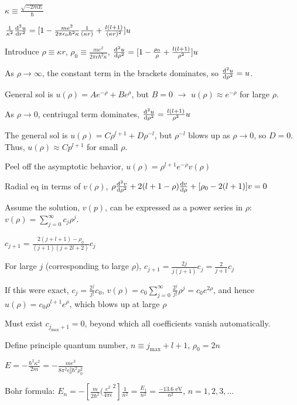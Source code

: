$\kappa \equiv \frac{\sqrt{-2mE}}{\hbar}$

$\frac{1}{\kappa^2} \dv[2]{u}{r} = [1 - \frac{me^2}{2 \pi \epsilon_0 \hbar^2 \kappa} \frac{1}{(\kappa r)} + \frac{l (l+1)}{(\kappa r)^2}] u$

Introduce $\rho \equiv \kappa r$, $\rho_0 \equiv \frac{me^2}{2 \pi \epsilon \hbar^2 \kappa}$, $\dv[2]{u}{\rho} = [1 - \frac{\rho_0}{\rho} + \frac{l(l+1)}{\rho^2}]u$

As $\rho \rightarrow \infty$, the constant term in the brackets dominates, so $\dv[2]{u}{\rho} = u$.

General sol is $u(\rho) = Ae^{-\rho} + Be^{\rho}$, but $B=0$ $\rightarrow$ $u(\rho) \approx e^{-\rho}$ for large $\rho$.

As $\rho \rightarrow 0$, centriugal term dominates, $\dv[2]{u}{\rho} = \frac{l(l+1)}{\rho^2} u$

The general sol is $u(\rho) = C \rho^{l+1} + D \rho^{-l}$, but $\rho^{-l}$ blows up as $\rho \rightarrow 0$, so $D = 0$. Thus, $u(\rho) \approx C p^{l+1}$ for small $\rho$. 

Peel off the asymptotic behavior, $u(\rho) = \rho^{l+1} e^{-\rho} v(\rho)$

Radial eq in terms of $v(\rho)$, $\rho \dv[2]{v}{\rho} + 2(l + 1 - \rho) \dv{v}{\rho} + [\rho_0 - 2(l+1)]v = 0$

Assume the solution, $v(p)$, can be expressed as a power series in $\rho$: $v(\rho) = \sum_{j=0}^{\infty} c_j \rho^j$.

$c_{j+1} = \frac{2(j+l+1) - \rho_0}{(j+1)(j+2l+2)} c_j$

For large $j$ (corresponding to large $\rho$), $c_{j+1} = \frac{2j}{j(j+1)}c_j = \frac{2}{j+1}c_j$

If this were exact, $c_j = \frac{2^j}{j!} c_0$, $v(\rho) = c_0 \sum_{j=0}^{\infty} \frac{2^j}{j!} \rho^j = c_0 e^{2\rho}$, and hence $u(\rho) = c_0 \rho^{l+1} e^{\rho}$, which blows up at large $\rho$

Must exist $c_{j_{\textrm{max}} + 1} = 0$, beyond which all coefficients vanish automatically.

Define principle quantum number, $n \equiv j_{\textrm{max}} + l + 1$, $\rho_0 = 2n$

$E = -\frac{\hbar^2 \kappa^2}{2m} = - \frac{me^3}{8 \pi^2 \epsilon_0^2 \hbar^2 \rho_0^2}$

Bohr formula: $E_n = - [\frac{m}{2 \hbar^2} (\frac{e^2}{4\pi\epsilon}^2] \frac{1}{n^2} = \frac{E_1}{n^2} = \frac{-13.6 \textrm{ eV}}{n^2}$, $n=1, 2, 3, ...$

